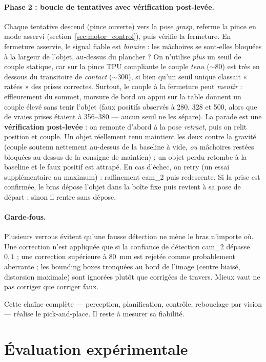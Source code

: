 \paragraph{Phase 2 : boucle de tentatives avec vérification post-levée.} Chaque
tentative descend (pince ouverte) vers la pose \textit{grasp}, referme la pince en
mode asservi (section~\ref{sec:motor_control}), puis vérifie la fermeture. En
fermeture asservie, le signal fiable est \emph{binaire} : les mâchoires se
sont-elles bloquées à la largeur de l'objet, au-dessus du plancher ? On
n'utilise \emph{plus} un seuil de couple statique, car sur la pince TPU compliante
le couple \emph{tenu} ($\sim$80) est très en dessous du transitoire de
\emph{contact} ($\sim$300), si bien qu'un seuil unique classait « ratées » des
prises correctes. Surtout, le couple à la fermeture peut \emph{mentir} :
effleurement du sommet, morsure de bord ou appui sur la table donnent un couple
élevé sans tenir l'objet (faux positifs observés à 280, 328 et 500, alors que de
vraies prises étaient à 356--380 — aucun seuil ne les sépare). La parade est une
\textbf{vérification post-levée} : on remonte d'abord à la pose \textit{retract},
puis on relit position et couple. Un objet réellement tenu maintient les deux
contre la gravité (couple soutenu nettement au-dessus de la baseline à vide,
\emph{ou} mâchoires restées bloquées au-dessus de la consigne de maintien) ; un
objet perdu retombe à la baseline et le faux positif est attrapé. En cas d'échec,
on retry (un essai supplémentaire au maximum) : raffinement cam\_2 puis
redescente. Si la prise est confirmée, le bras dépose l'objet dans la boîte fixe
puis revient à sa pose de départ ; sinon il rentre sans dépose.

\paragraph{Garde-fous.} Plusieurs verrous évitent qu'une fausse détection ne
mène le bras n'importe où. Une correction n'est appliquée que si la confiance de
détection cam\_2 dépasse $0{,}1$ ; une correction supérieure à 80~mm est rejetée
comme probablement aberrante ; les bounding boxes tronquées au bord de l'image
(centre biaisé, distorsion maximale) sont ignorées plutôt que corrigées de
travers. Mieux vaut ne pas corriger que corriger faux.

Cette chaîne complète — perception, planification, contrôle, rebouclage par
vision — réalise le pick-and-place. Il reste à mesurer sa fiabilité.

\section{Évaluation expérimentale}
\label{sec:eval}

